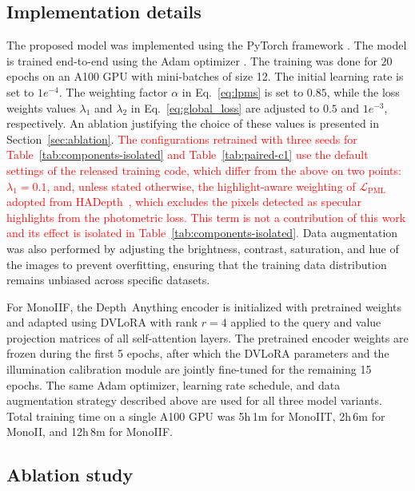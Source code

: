 \documentclass[a4paper,fleqn]{cas-dc}
\begin{document}
{\subsection{Implementation details}

The proposed model was implemented using the PyTorch framework \citep{pytorch_2019}. The model is trained end-to-end  using the Adam optimizer \citep{Adam_ICLR_2015}. The training was done for $20$ epochs on an A100 GPU with mini-batches of size 12. The initial learning rate is set to $1e^{-4}$. The weighting factor $\alpha$ in Eq.~\eqref{eq:lpms} is set to $0.85$, while the loss weights values $\lambda_1$ and $\lambda_2$ in Eq.~\eqref{eq:global_loss} are adjusted to $0.5$ and $1 e^{-3}$, respectively. An ablation justifying the choice of these values is presented in Section~\ref{sec:ablation}. \textcolor{red}{The configurations retrained with three seeds for Table~\ref{tab:components-isolated} and Table~\ref{tab:paired-c1} use the default settings of the released training code, which differ from the above on two points: $\lambda_1 = 0.1$, and, unless stated otherwise, the highlight-aware weighting of $\mathcal{L}_\textrm{PML}$ adopted from HADepth~\citep{HAdepth_2025}, which excludes the pixels detected as specular highlights from the photometric loss. This term is not a contribution of this work and its effect is isolated in Table~\ref{tab:components-isolated}.} Data augmentation was also performed by adjusting the brightness, contrast, saturation, and hue of the images to prevent overfitting,  ensuring that the training data distribution remains unbiased across specific datasets. 
%

For MonoIIF, the Depth~Anything encoder is initialized with pretrained weights and adapted using DVLoRA with 
rank $r=4$ applied to the query and value projection matrices of all self-attention layers. The pretrained 
encoder weights are frozen during the first 5 epochs, after which the DVLoRA parameters and the illumination 
calibration module are jointly fine-tuned for the remaining 15 epochs. The same Adam optimizer, learning 
rate schedule, and data augmentation strategy described above are used for all three model variants. Total 
training time on a single A100 GPU was 5h\,1m for MonoIIT, 2h\,6m for MonoII, and 12h\,8m for MonoIIF.
%
\subsection{Ablation study \label{sec:ablation}}
%

}
\end{document}
